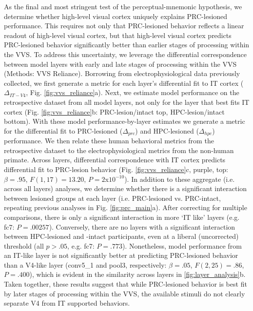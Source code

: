 \documentclass[11pt]{article}
\begin{document}
As the final and most stringent test of the perceptual-mnemonic hypothesis, we determine whether high-level visual cortex uniquely explains PRC-lesioned performance. This requires not only that PRC-lesioned behavior reflects a linear readout of high-level visual cortex, but that high-level visual cortex predicts PRC-lesioned behavior significantly better than earlier stages of processing within the VVS. To address this uncertainty, we leverage the differential correspondence between model layers with early and late stages of processing within the VVS (Methods: VVS Reliance). Borrowing from electrophysiological data previously collected\cite{majaj2015simple}, we first generate a metric for each layer's differential fit to IT cortex ($\Delta_{IT-V4}$, Fig. \ref{fig:vvs_reliance}a). Next, we estimate model performance on the retrospective dataset from all model layers, not only for the layer that best fits IT cortex (Fig. \ref{fig:vvs_reliance}b: PRC-lesion/intact top, HPC-lesion/intact bottom). With these model performance-by-layer estimates we generate a metric for the differential fit to PRC-lesioned ($\Delta_{prc}$) and HPC-lesioned ($\Delta_{hpc}$) performance. We then relate these human behavioral metrics from the retrospective dataset to the electrophysiological metrics from the non-human primate. Across layers, differential correspondence with IT cortex predicts differential fit to PRC-lesion behavior (Fig. \ref{fig:vvs_reliance}c, purple, top: $\beta = .95$, $F(1, 17) = 13.20$, $P = 2$x$ 10^{-10}$). In addition to these aggregate (i.e. across all layers) analyses, we determine whether there is a significant interaction between lesioned groups at each layer (i.e. PRC-lesioned vs. PRC-intact, repeating previous analyses in Fig. \ref{fig:prc_main}a). After correcting for multiple comparisons, there is only a significant interaction in more `IT like' layers (e.g. fc7: $P = .00257$). Conversely, there are no layers with a significant interaction between HPC-lesioned and -intact participants, even at a liberal (uncorrected) threshold (all $p > .05$, e.g. fc7: $P = .773$). Nonetheless, model performance from an IT-like layer is not significantly better at predicting PRC-lesioned behavior than a V4-like layer (conv5\_1 and pool3, respectively: $\beta = .05$,  $F(2, 25) = .86$, $P = .400$), which is evident in the similarity across layers in \ref{fig:layer_analysis}b. Taken together, these results suggest that while PRC-lesioned behavior is best fit by later stages of processing within the VVS, the available stimuli do not clearly separate V4 from IT supported behaviors. 
\end{document}
